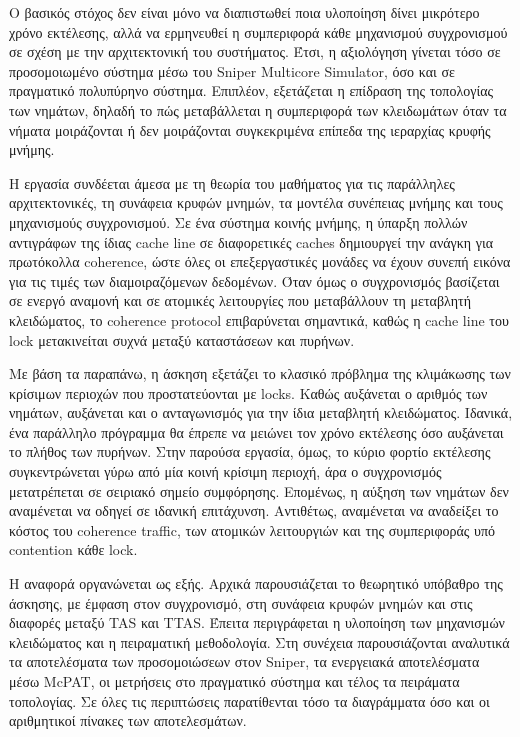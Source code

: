 \documentclass{article}
\providecommand{\textenglish}[1]{\foreignlanguage{english}{#1}}
\begin{document}
Ο βασικός στόχος δεν είναι μόνο να διαπιστωθεί ποια υλοποίηση δίνει μικρότερο χρόνο εκτέλεσης, αλλά να ερμηνευθεί η συμπεριφορά κάθε μηχανισμού συγχρονισμού σε σχέση με την αρχιτεκτονική του συστήματος. Έτσι, η αξιολόγηση γίνεται τόσο σε προσομοιωμένο σύστημα μέσω του \textenglish{Sniper Multicore Simulator}, όσο και σε πραγματικό πολυπύρηνο σύστημα. Επιπλέον, εξετάζεται η επίδραση της τοπολογίας των νημάτων, δηλαδή το πώς μεταβάλλεται η συμπεριφορά των κλειδωμάτων όταν τα νήματα μοιράζονται ή δεν μοιράζονται συγκεκριμένα επίπεδα της ιεραρχίας κρυφής μνήμης.

Η εργασία συνδέεται άμεσα με τη θεωρία του μαθήματος για τις παράλληλες αρχιτεκτονικές, τη συνάφεια κρυφών μνημών, τα μοντέλα συνέπειας μνήμης και τους μηχανισμούς συγχρονισμού. Σε ένα σύστημα κοινής μνήμης, η ύπαρξη πολλών αντιγράφων της ίδιας cache line σε διαφορετικές caches δημιουργεί την ανάγκη για πρωτόκολλα coherence, ώστε όλες οι επεξεργαστικές μονάδες να έχουν συνεπή εικόνα για τις τιμές των διαμοιραζόμενων δεδομένων. Όταν όμως ο συγχρονισμός βασίζεται σε ενεργό αναμονή και σε ατομικές λειτουργίες που μεταβάλλουν τη μεταβλητή κλειδώματος, το coherence protocol επιβαρύνεται σημαντικά, καθώς η cache line του lock μετακινείται συχνά μεταξύ καταστάσεων και πυρήνων.

Με βάση τα παραπάνω, η άσκηση εξετάζει το κλασικό πρόβλημα της κλιμάκωσης των κρίσιμων περιοχών που προστατεύονται με locks. Καθώς αυξάνεται ο αριθμός των νημάτων, αυξάνεται και ο ανταγωνισμός για την ίδια μεταβλητή κλειδώματος. Ιδανικά, ένα παράλληλο πρόγραμμα θα έπρεπε να μειώνει τον χρόνο εκτέλεσης όσο αυξάνεται το πλήθος των πυρήνων. Στην παρούσα εργασία, όμως, το κύριο φορτίο εκτέλεσης συγκεντρώνεται γύρω από μία κοινή κρίσιμη περιοχή, άρα ο συγχρονισμός μετατρέπεται σε σειριακό σημείο συμφόρησης. Επομένως, η αύξηση των νημάτων δεν αναμένεται να οδηγεί σε ιδανική επιτάχυνση. Αντιθέτως, αναμένεται να αναδείξει το κόστος του coherence traffic, των ατομικών λειτουργιών και της συμπεριφοράς υπό contention κάθε lock.

Η αναφορά οργανώνεται ως εξής. Αρχικά παρουσιάζεται το θεωρητικό υπόβαθρο της άσκησης, με έμφαση στον συγχρονισμό, στη συνάφεια κρυφών μνημών και στις διαφορές μεταξύ TAS και TTAS. Έπειτα περιγράφεται η υλοποίηση των μηχανισμών κλειδώματος και η πειραματική μεθοδολογία. Στη συνέχεια παρουσιάζονται αναλυτικά τα αποτελέσματα των προσομοιώσεων στον Sniper, τα ενεργειακά αποτελέσματα μέσω McPAT, οι μετρήσεις στο πραγματικό σύστημα και τέλος τα πειράματα τοπολογίας. Σε όλες τις περιπτώσεις παρατίθενται τόσο τα διαγράμματα όσο και οι αριθμητικοί πίνακες των αποτελεσμάτων.
\end{document}
